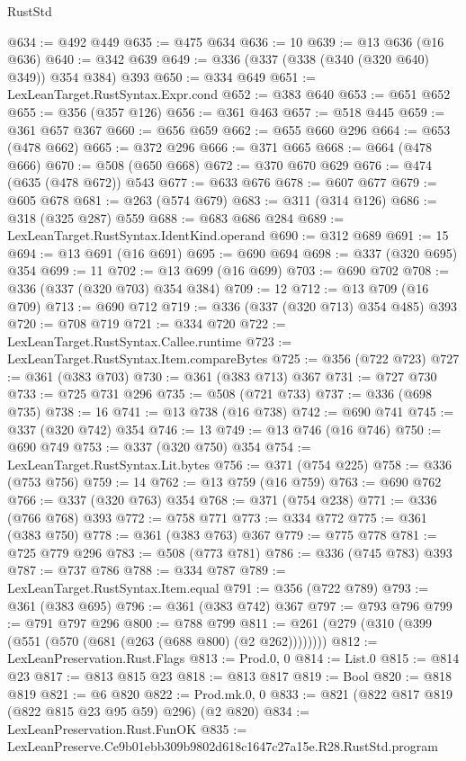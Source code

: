 \begin{lexlean}{RustStd}
\begin{coremodule}
@634 := @492 @449
@635 := @475 @634
@636 := 10
@639 := @13 @636 (@16 @636)
@640 := @342 @639
@649 := @336 (@337 (@338 (@340 (@320 @640) @349)) @354 @384) @393
@650 := @334 @649
@651 := LexLeanTarget.RustSyntax.Expr.cond
@652 := @383 @640
@653 := @651 @652
@655 := @356 (@357 @126)
@656 := @361 @463
@657 := @518 @445
@659 := @361 @657 @367
@660 := @656 @659
@662 := @655 @660 @296
@664 := @653 (@478 @662)
@665 := @372 @296
@666 := @371 @665
@668 := @664 (@478 @666)
@670 := @508 (@650 @668)
@672 := @370 @670 @629
@676 := @474 (@635 (@478 @672)) @543
@677 := @633 @676
@678 := @607 @677
@679 := @605 @678
@681 := @263 (@574 @679)
@683 := @311 (@314 @126)
@686 := @318 (@325 @287) @559
@688 := @683 @686 @284
@689 := LexLeanTarget.RustSyntax.IdentKind.operand
@690 := @312 @689
@691 := 15
@694 := @13 @691 (@16 @691)
@695 := @690 @694
@698 := @337 (@320 @695) @354
@699 := 11
@702 := @13 @699 (@16 @699)
@703 := @690 @702
@708 := @336 (@337 (@320 @703) @354 @384)
@709 := 12
@712 := @13 @709 (@16 @709)
@713 := @690 @712
@719 := @336 (@337 (@320 @713) @354 @485) @393
@720 := @708 @719
@721 := @334 @720
@722 := LexLeanTarget.RustSyntax.Callee.runtime
@723 := LexLeanTarget.RustSyntax.Item.compareBytes
@725 := @356 (@722 @723)
@727 := @361 (@383 @703)
@730 := @361 (@383 @713) @367
@731 := @727 @730
@733 := @725 @731 @296
@735 := @508 (@721 @733)
@737 := @336 (@698 @735)
@738 := 16
@741 := @13 @738 (@16 @738)
@742 := @690 @741
@745 := @337 (@320 @742) @354
@746 := 13
@749 := @13 @746 (@16 @746)
@750 := @690 @749
@753 := @337 (@320 @750) @354
@754 := LexLeanTarget.RustSyntax.Lit.bytes
@756 := @371 (@754 @225)
@758 := @336 (@753 @756)
@759 := 14
@762 := @13 @759 (@16 @759)
@763 := @690 @762
@766 := @337 (@320 @763) @354
@768 := @371 (@754 @238)
@771 := @336 (@766 @768) @393
@772 := @758 @771
@773 := @334 @772
@775 := @361 (@383 @750)
@778 := @361 (@383 @763) @367
@779 := @775 @778
@781 := @725 @779 @296
@783 := @508 (@773 @781)
@786 := @336 (@745 @783) @393
@787 := @737 @786
@788 := @334 @787
@789 := LexLeanTarget.RustSyntax.Item.equal
@791 := @356 (@722 @789)
@793 := @361 (@383 @695)
@796 := @361 (@383 @742) @367
@797 := @793 @796
@799 := @791 @797 @296
@800 := @788 @799
@811 := @261 (@279 (@310 (@399 (@551 (@570 (@681 (@263 (@688 @800) (@2 @262))))))))
@812 := LexLeanPreservation.Rust.Flags
@813 := Prod.{0, 0}
@814 := List.{0}
@815 := @814 @23
@817 := @813 @815 @23
@818 := @813 @817
@819 := Bool
@820 := @818 @819
@821 := @6 @820
@822 := Prod.mk.{0, 0}
@833 := @821 (@822 @817 @819 (@822 @815 @23 @95 @59) @296) (@2 @820)
@834 := LexLeanPreservation.Rust.FunOK
@835 := LexLeanPreserve.Ce9b01ebb309b9802d618c1647c27a15e.R28.RustStd.program

\end{coremodule}
\end{lexlean}

